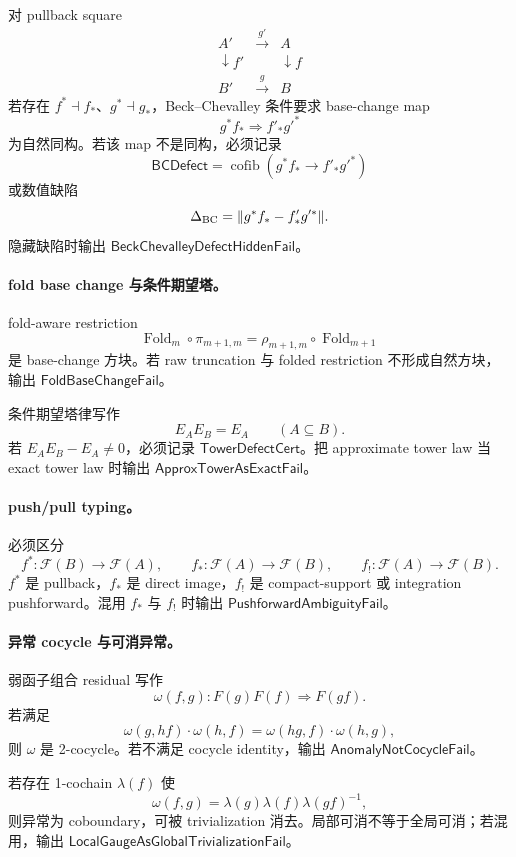对 pullback square
\[
\begin{array}{ccc}
A' & \xrightarrow{g'} & A\\
\downarrow f' & & \downarrow f\\
B' & \xrightarrow{g} & B
\end{array}
\]
若存在 \(f^*\dashv f_*\)、\(g^*\dashv g_*\)，Beck--Chevalley 条件要求 base-change map
\[
\boxed{
g^*f_*\Rightarrow f'_*g'^*
}
\]
为自然同构。若该 map 不是同构，必须记录
\[
\mathsf{BCDefect}
=
\operatorname{cofib}(g^*f_*\to f'_*g'^*)
\]
或数值缺陷
\[
\Delta_{\rm BC}=\|g^*f_*-f'_*g'^*\|.
\]
隐藏缺陷时输出 \(\mathsf{BeckChevalleyDefectHiddenFail}\)。

\paragraph{fold base change 与条件期望塔。}
fold-aware restriction
\[
\operatorname{Fold}_m\circ\pi_{m+1,m}
=
\rho_{m+1,m}\circ\operatorname{Fold}_{m+1}
\]
是 base-change 方块。若 raw truncation 与 folded restriction 不形成自然方块，输出 \(\mathsf{FoldBaseChangeFail}\)。

条件期望塔律写作
\[
\boxed{
E_AE_B=E_A\qquad(A\subseteq B).
}
\]
若 \(E_AE_B-E_A\ne0\)，必须记录 \(\mathsf{TowerDefectCert}\)。把 approximate tower law 当 exact tower law 时输出 \(\mathsf{ApproxTowerAsExactFail}\)。

\paragraph{push/pull typing。}
必须区分
\[
f^*:\mathcal F(B)\to\mathcal F(A),
\qquad
f_*:\mathcal F(A)\to\mathcal F(B),
\qquad
f_!:\mathcal F(A)\to\mathcal F(B).
\]
\(f^*\) 是 pullback，\(f_*\) 是 direct image，\(f_!\) 是 compact-support 或 integration pushforward。混用 \(f_*\) 与 \(f_!\) 时输出 \(\mathsf{PushforwardAmbiguityFail}\)。

\paragraph{异常 cocycle 与可消异常。}
弱函子组合 residual 写作
\[
\omega(f,g):F(g)F(f)\Rightarrow F(gf).
\]
若满足
\[
\boxed{
\omega(g,hf)\cdot\omega(h,f)
=
\omega(hg,f)\cdot\omega(h,g),
}
\]
则 \(\omega\) 是 2-cocycle。若不满足 cocycle identity，输出 \(\mathsf{AnomalyNotCocycleFail}\)。

若存在 1-cochain \(\lambda(f)\) 使
\[
\boxed{
\omega(f,g)=\lambda(g)\lambda(f)\lambda(gf)^{-1},
}
\]
则异常为 coboundary，可被 trivialization 消去。局部可消不等于全局可消；若混用，输出 \(\mathsf{LocalGaugeAsGlobalTrivializationFail}\)。

